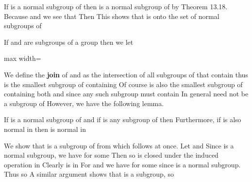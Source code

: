 \documentclass[11pt,oneside]{article}
\begin{document}
\begin{BookBody}

If  is a normal subgroup of  then  is a normal subgroup of  by Theorem 13.18. Because  and  we see that  Then  This shows that \BookInline{\phi } is onto the set of normal subgroups of \BookEnd{\blacklozenge}

If  and  are subgroups of a group  then we let

\begin{center}\begin{adjustbox}{max width=\linewidth}\end{adjustbox}\end{center}

\noindent We define the\textbf{ join}  of  and  as the intersection of all subgroups of  that contain  thus  is the smallest subgroup of  containing  Of course  is also the smallest subgroup of  containing both  and  since any such subgroup must contain  In general need not be a subgroup of  However, we have the following lemma.

 If  is a normal subgroup of  and if  is any subgroup of  then   Furthermore, if  is also normal in  then  is normal in 

 We show that  is a subgroup of  from which  follows at once. Let  and  Since  is a normal subgroup, we have  for some  Then  so  is closed under the induced operation in  Clearly  is in  For  and  we have  for some  since  is a normal subgroup. Thus  so  A similar argument shows that  is a subgroup, so 


\end{BookBody}
\end{document}
